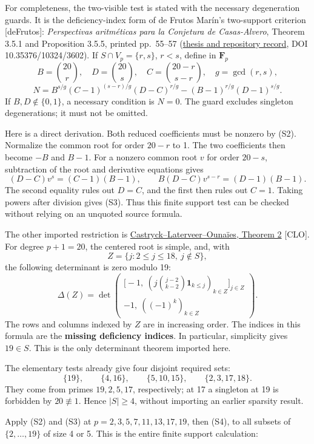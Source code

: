 \documentclass[
  british,
  10pt,
]{article}
\begin{document}
For completeness, the two-visible test is stated with the necessary
degeneration guards. It is the deficiency-index form of de Frutos
Marín's two-support criterion {[}deFrutos{]}: \emph{Perspectivas
aritméticas para la Conjetura de Casas-Alvero}, Theorem 3.5.1 and
Proposition 3.5.5, printed pp.~55--57
(\href{https://uvadoc.uva.es/handle/10324/3602?show=full}{thesis and
repository record}, DOI 10.35376/10324/3602). If \(S\cap V_p=\{r,s\}\),
\(r<s\), define in \(\mathbf F_p\) \[
B=\binom{20}{r},\quad D=\binom{20}{s},\quad
C=\binom{20-r}{s-r},\quad g=\gcd(r,s),
\] \[
N=B^{s/g}(C-1)^{(s-r)/g}(D-C)^{r/g}
 -(B-1)^{r/g}(D-1)^{s/g}.
\tag{S3}
\] If \(B,D\notin\{0,1\}\), a necessary condition is \(N=0\). The guard
excludes singleton degenerations; it must not be omitted.

Here is a direct derivation. Both reduced coefficients must be nonzero
by (S2). Normalize the common root for order \(20-r\) to 1. The two
coefficients then become \(-B\) and \(B-1\). For a nonzero common root
\(v\) for order \(20-s\), subtraction of the root and derivative
equations gives \[
(D-C)v^s=(C-1)(B-1),\qquad
B(D-C)v^{s-r}=(D-1)(B-1).
\] The second equality rules out \(D=C\), and the first then rules out
\(C=1\). Taking powers after division gives (S3). Thus this finite
support test can be checked without relying on an unquoted source
formula.

The other imported restriction is
\href{https://arxiv.org/html/1208.5404}{Castryck--Laterveer--Ounaïes,
Theorem 2} {[}CLO{]}. For degree \(p+1=20\), the centered root is
simple, and, with \[
Z=\{j:2\le j\le18,\ j\notin S\},
\] the following determinant is zero modulo 19: \[
\Delta(Z)=
\det\begin{pmatrix}
\bigl[-1,\ (j\binom{j-2}{k-2}\mathbf1_{k\le j})_{k\in Z}\bigr]_{j\in Z}\\
-1,\ ((-1)^k)_{k\in Z}
\end{pmatrix}.
\tag{S4}
\] The rows and columns indexed by \(Z\) are in increasing order. The
indices in this formula are the \textbf{missing deficiency indices}. In
particular, simplicity gives \(19\in S\). This is the only determinant
theorem imported here.

The elementary tests already give four disjoint required sets: \[
\{19\},\qquad\{4,16\},\qquad
\{5,10,15\},\qquad\{2,3,17,18\}.
\tag{S5}
\] They come from primes \(19,2,5,17\), respectively; at 17 a singleton
at 19 is forbidden by \(20\not\equiv1\). Hence \(|S|\ge4\), without
importing an earlier sparsity result.

Apply (S2) and (S3) at \(p=2,3,5,7,11,13,17,19\), then (S4), to all
subsets of \(\{2,\ldots,19\}\) of size 4 or 5. This is the entire finite
support calculation:
\end{document}

